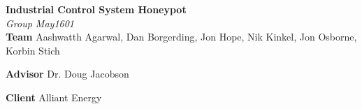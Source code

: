 


\begin{center}
\begin{minipage}[b]{0.75\linewidth}
\begin{center}

\veryHuge \color{NavyBlue} \textbf{Industrial Control System Honeypot} \color{Blue} \\[0.2cm] %
\Huge\textit{Group May1601}\\[0.4cm]

\color{Black} \Large \textbf{Team}
\Large Aashwatth Agarwal, Dan Borgerding, Jon Hope, Nik Kinkel, Jon Osborne, Korbin Stich

\setlength{\columnseprule}{0pt}
\begin{multicols}{2}
\Large \textbf{Advisor} Dr. Doug Jacobson

\Large \textbf{Client} Alliant Energy
\end{multicols}
\end{center}
\end{minipage}
\end{center}
%
\vspace{1cm} %
